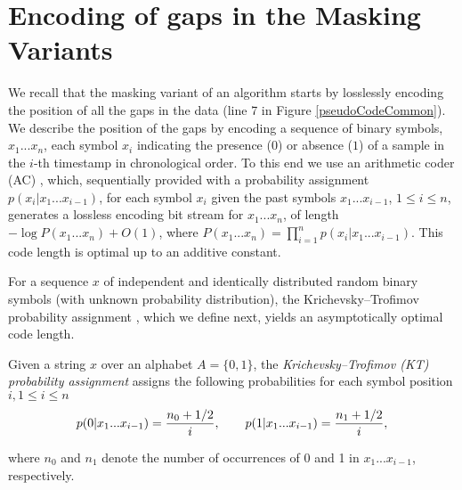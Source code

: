 
\vspace{-10pt}
\section{Encoding of gaps in the Masking Variants}
\label{algo:maskmodes}


\newcommand{\xOneN}{x_1...x_n}
\newcommand{\StringSeq}{x_1...x_{i-1}}
\newcommand{\xiiminus}{p(x_i|\StringSeq)}
\vspace{-5pt}
We recall that the masking variant of an algorithm starts by losslessly encoding the position of all the gaps in the data (line 7 in Figure \ref{pseudoCodeCommon}). We describe the position of the gaps by encoding a sequence of binary symbols, $\xOneN$, each symbol $x_i$ indicating the presence ($0$) or absence ($1$) of a sample in the $i$-th timestamp in chronological order. To this end we use an arithmetic coder (AC) \cite{arcoding, ac2, Cover2005}, which, sequentially provided with a probability assignment $\xiiminus$, for each symbol $x_i$ given the past symbols $x_1...x_{i-1}$, $1\leq i \leq n$, generates a lossless encoding bit stream for $\xOneN$, of length $-\log P(\xOneN) + O(1)$, where $P(\xOneN)=\prod_{i=1}^{n}\xiiminus$. This code length is optimal up to an additive constant.


For a sequence $x$ of independent and identically distributed random binary symbols (with unknown probability distribution), the Krichevsky–Trofimov probability assignment \cite{ktestimator}, which we define next, yields an asymptotically optimal code length.


\begin{defcion}
\label{def:ktestimator}
Given a string $x$ over an alphabet $A = \{0, 1\}$, the \textit{Krichevsky–Trofimov (KT) probability assignment} assigns the following probabilities for each symbol position $i, 1\leq i \leq n$
\vspace{-2pt}
\begin{equation}
\label{eq:ktestimator}
p(0|\StringSeq) = \frac{n_0 + 1/2}{i}, \hspace{+20pt} p(1|\StringSeq) = \frac{n_1 + 1/2}{i},
\end{equation}
\end{defcion}
\vspace{-8pt}
where $n_0$ and $n_1$ denote the number of occurrences of 0 and 1 in $\StringSeq$, respectively.


